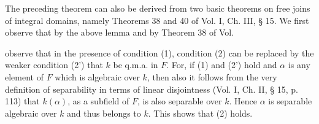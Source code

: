 The preceding theorem can also be derived from two basic theorems on free joins of integral domains, namely Theorems 38 and 40 of Vol. I, Ch. III, § 15. We first observe that by the above lemma and by Theorem 38 of Vol.

observe that in the presence of condition (1), condition (2) can be replaced by the weaker condition (2') that $k$ be q.m.a. in $F$. For, if (1) and (2') hold and $\alpha$ is any element of $F$ which is algebraic over $k$, then also it follows from the very definition of separability in terms of linear disjointness (Vol. I, Ch. II, § 15, p. 113) that $k(\alpha)$, as a subfield of $F$, is also separable over $k$. Hence $\alpha$ is separable algebraic over $k$ and thus belongs to $k$. This shows that (2) holds.